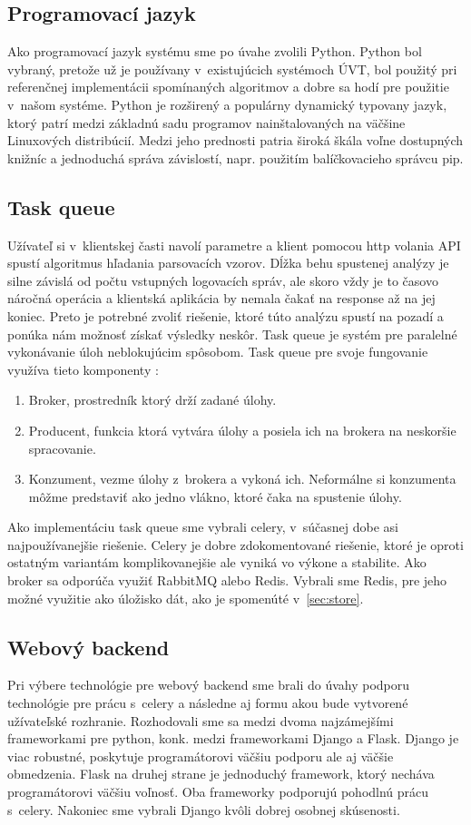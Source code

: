 \subsection{Programovací jazyk}
Ako programovací jazyk systému sme po úvahe zvolili Python. Python bol vybraný, pretože už je používany v~existujúcich systémoch ÚVT, bol použitý pri referenčnej implementácii spomínaných algoritmov a dobre sa hodí pre použitie v~našom systéme. Python je rozširený a populárny dynamický typovany jazyk, ktorý patrí medzi základnú sadu programov nainštalovaných na väčšine Linuxových distribúcií. Medzi jeho prednosti patria široká škála voľne dostupných knižníc a jednoduchá správa závislostí, napr. použitím balíčkovacieho správcu pip. 

\subsection{Task queue}
Užívateľ si v~klientskej časti navolí parametre a klient pomocou http volania API spustí algoritmus hľadania parsovacích vzorov.
Dĺžka behu spustenej analýzy je silne závislá od počtu vstupných logovacích správ, ale skoro vždy je to časovo náročná operácia a klientská aplikácia by nemala čakať na response až na jej koniec. Preto je potrebné zvoliť riešenie, ktoré túto analýzu spustí na pozadí a ponúka nám možnosť získať výsledky neskôr. Task queue je systém pre paralelné vykonávanie úloh neblokujúcim spôsobom. Task queue pre svoje fungovanie využíva tieto komponenty :

\begin{enumerate}
  \item Broker, prostredník ktorý drží zadané úlohy.
  \item Producent, funkcia ktorá vytvára úlohy a posiela ich na brokera na neskoršie spracovanie.
  \item Konzument, vezme úlohy z~brokera a vykoná ich. Neformálne si konzumenta môžme predstaviť ako jedno vlákno, ktoré čaka na spustenie úlohy.
\end{enumerate}

Ako implementáciu task queue sme vybrali celery, v~súčasnej dobe asi najpoužívanejšie riešenie. Celery je dobre zdokomentované riešenie, ktoré je oproti ostatným variantám komplikovanejšie ale vyniká vo výkone a stabilite. Ako broker sa odporúča využiť RabbitMQ alebo Redis. Vybrali sme Redis, pre jeho možné využitie ako úložisko dát, ako je spomenúté v~\ref{sec:store}.

\subsection{Webový backend}
Pri výbere technológie pre webový backend sme brali do úvahy podporu technológie pre prácu s~celery a následne aj formu akou bude vytvorené užívateľské rozhranie. Rozhodovali sme sa medzi dvoma najzámejšími frameworkami pre python, konk. medzi frameworkami Django a Flask. Django je viac robustné, poskytuje programátorovi väčšiu podporu ale aj väčšie obmedzenia. Flask na druhej strane je jednoduchý framework, ktorý necháva programátorovi väčšiu voľnosť. Oba frameworky podporujú pohodlnú prácu s~celery. Nakoniec sme vybrali Django kvôli dobrej osobnej skúsenosti.

